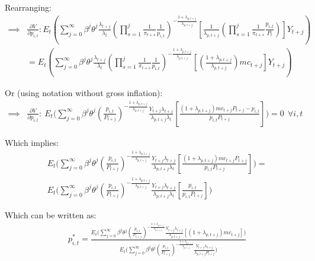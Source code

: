 \documentclass[article,11pt,letterpaper,fleqn]{article}
\theoremstyle{definition}
\numberwithin{equation}{section}
\begin{document}
Rearranging:
\begin{equation}
\begin{split}
\implies & \frac{\partial V}{\partial p_{i,t}}: E_{t}  \left(\sum_{j=0}^{\infty} \beta^{j}\theta^{j}\frac{\lambda_{t+j}}{\lambda_{t}}\left(\prod_{s=1}^{j}\frac{1}{\pi_{t+s}}\frac{1}{p_{i,t}}\right)^{-\frac{1+\lambda_{p,t+j}}{\lambda_{p,t+j}}}\left[\frac{1}{\lambda_{p,t+j}}\left(\prod_{s=1}^{j}\frac{1}{\pi_{t+s}}\frac{p_{i,t}}{P_{t}}\right)\right]Y_{t+j}\right) \\
& = E_{t}  \left(\sum_{j=0}^{\infty} \beta^{j}\theta^{j}\frac{\lambda_{t+j}}{\lambda_{t}}\left(\prod_{s=1}^{j}\frac{1}{\pi_{t+s}}\frac{1}{p_{i,t}}\right)^{-\frac{1+\lambda_{p,t+j}}{\lambda_{p,t+j}}}\left[\left(\frac{1+\lambda_{p,t+j}}{\lambda_{p,t+j}}\right)mc_{t+j}\right]Y_{t+j}\right)
\end{split}
\end{equation}


Or (using notation without gross inflation):
\begin{equation}
\begin{split}
\implies  &  \frac{\partial V}{\partial p_{i,t}}:\: E_{t}\Biggl(\sum_{j=0}^{\infty}\beta^{j}\theta^{j}\left(\frac{p_{i,t}}{P_{t+j}}\right)^{-\frac{1+\lambda_{p,t+j}}{\lambda_{p,t+j}}}\frac{Y_{t+j}\lambda_{t+j}}{\lambda_{p,t+j}\lambda_{t}}\left[\frac{(1+\lambda_{p,t+j})mc_{t+j}P_{t+j} - p_{i,t}}{p_{i,t}P_{t+j}}\right]\Biggr) = 0 \ \ \forall i,t
\end{split}
\end{equation}

Which implies:
\begin{equation}
\begin{split}
 &   E_{t}\Biggl(\sum_{j=0}^{\infty}\beta^{j}\theta^{j}\left(\frac{p_{i,t}}{P_{t+j}}\right)^{-\frac{1+\lambda_{p,t+j}}{\lambda_{p,t+j}}}\frac{Y_{t+j}\lambda_{t+j}}{\lambda_{p,t+j}\lambda_{t}}\left[\frac{(1+\lambda_{p,t+j})mc_{t+j}P_{t+j}}{p_{i,t}P_{t+j}}\right]\Biggr) =  \\
 & E_{t}\Biggl(\sum_{j=0}^{\infty}\beta^{j}\theta^{j}\left(\frac{p_{i,t}}{P_{t+j}}\right)^{-\frac{1+\lambda_{p,t+j}}{\lambda_{p,t+j}}}\frac{Y_{t+j}\lambda_{t+j}}{\lambda_{p,t+j}\lambda_{t}}\left[\frac{p_{i,t}}{p_{i,t}P_{t+j}}\right]\Biggr)
\end{split}
\end{equation}

Which can be written as:
\begin{equation}
\begin{split}
 &   p_{i,t}^{*}=\frac{E_{t}\Biggl(\sum_{j=0}^{\infty}\beta^{j}\theta^{j}\left(\frac{p_{i,t}}{P_{t+j}}\right)^{-\frac{1+\lambda_{p,t+j}}{\lambda_{p,t+j}}}\frac{Y_{t+j}\lambda_{t+j}}{\lambda_{p,t+j}}\left[(1+\lambda_{p,t+j})mc_{t+j}\right]\Biggr)}{E_{t}\Biggl(\sum_{j=0}^{\infty}\beta^{j}\theta^{j}\left(\frac{p_{i,t}}{P_{t+j}}\right)^{-\frac{1+\lambda_{p,t+j}}{\lambda_{p,t+j}}}\frac{Y_{t+j}\lambda_{t+j}}{\lambda_{p,t+j}P_{t+j}}\Biggr)}
\end{split}
\end{equation}
\end{document}
